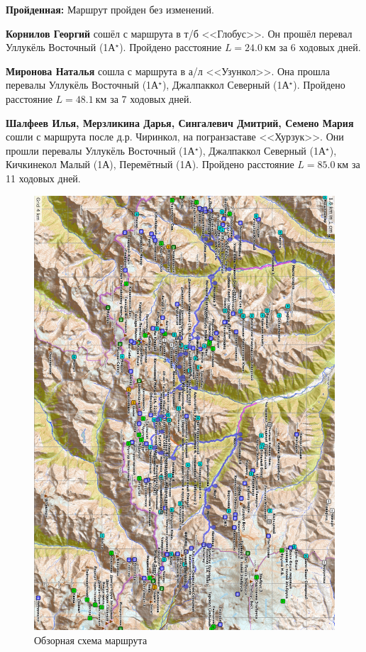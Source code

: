 \textbf{Пройденная:} Маршрут пройден без изменений.

\textbf{Корнилов Георгий} сошёл с маршрута в т/б <<Глобус>>. Он прошёл перевал Уллукёль Восточный (1А$^{\star}$). Пройдено расстояние $L=24.0~\text{км}$ за 6 ходовых дней.

\textbf{Миронова Наталья} сошла с маршрута в а/л <<Узункол>>. Она прошла перевалы Уллукёль Восточный (1А$^{\star}$), Джалпаккол Северный (1А$^{\star}$). Пройдено расстояние $L=48.
1~\text{км}$ за 7 ходовых дней.

\textbf{Шалфеев Илья, Мерзликина Дарья, Сингалевич Дмитрий, Семено Мария} сошли с маршрута после д.р. Чиринкол, на погранзаставе <<Хурзук>>. Они прошли перевалы Уллукёль Восточный (1А$^{\star}$), Джалпаккол Северный (1А$^{\star}$), Кичкинекол Малый (1А), Перемётный (1А). Пройдено расстояние $L=85.
0~\text{км}$ за 11 ходовых дней.

\begin{figure}[h!tbp]
	\centering
	\includegraphics[width=0.92\linewidth]{../pics/map}
	\caption{Обзорная схема маршрута}
\end{figure}

